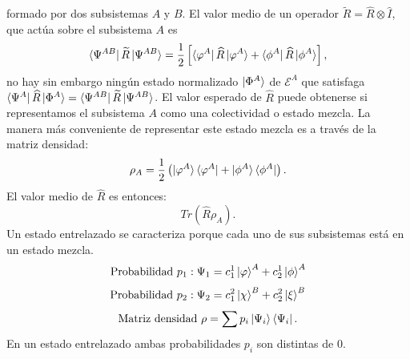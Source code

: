 \documentclass{article}
\theoremstyle{plain}
\theoremstyle{definition}
\begin{document}
	formado por dos subsistemas \(A\) y \(B\). El valor medio de un operador \(\widetilde{R} = \widehat{R}\otimes\widehat{I}\), que actúa sobre el subsistema \(A\) es \[\bra{\Psi^{AB}} \widetilde{R} \ket{\Psi^{AB}} = \frac{1}{2}\left[\bra{\varphi^{A}} \widehat{R} \ket{\varphi^{A}} + \bra{\phi^{A}} \widehat{R} \ket{\phi^{A}} \right],\] no hay sin embargo ningún estado normalizado \(\ket{\Phi^A} \) de \(\mathcal{E}^{A}\) que satisfaga \(\bra{\Psi^A} \widehat{R} \ket{\Phi^A}  =  \bra{\Psi^{AB}} \widetilde{R} \ket{\Psi^{AB}}\).  El valor esperado de \(\widehat{R} \) puede obtenerse si representamos el subsistema \(A\) como una colectividad o estado mezcla. La manera más conveniente de representar este estado mezcla es a través de la matriz densidad:
	\[\rho_A = \frac{1}{2}\left(\ket{\varphi^A}\bra{\varphi^A} + \ket{\phi^A}\bra{\phi^A}\right) \text{.}\] El valor medio de \(\hat{R}\) es entonces:\[Tr(\hat{R}\rho_A) \text{.}\] Un estado entrelazado se caracteriza porque cada uno de sus subsistemas está en un estado mezcla.
	\[\text{Probabilidad }p_1  : \Psi_1 = c^1_1\ket{\varphi}^A + c^1_2\ket{\phi}^A \]
	\[\text{Probabilidad }p_2  : \Psi_2 = c^2_1\ket{\chi}^B + c^2_2\ket{\xi}^B \]
	\[\text{Matriz densidad } \rho=\sum p_i \ket{\Psi_i}\bra{\Psi_i}\text{.} \]
	En un estado entrelazado ambas probabilidades \(p_i\) son distintas de 0. \(\)
	
	
	
\end{document}
